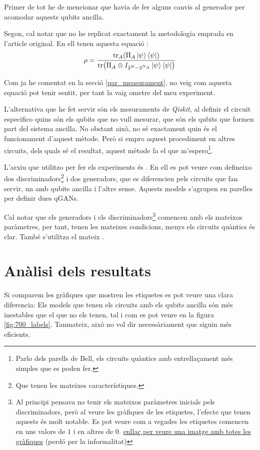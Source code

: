 Primer de tot he de mencionar que havia de fer alguns canvis al generador per acomodar aquests qubits ancilla. 

Segon, cal notar que no he replicat exactament la metodologia emprada en l'article original. En ell tenen aquesta equació \cite{QGAN_exp}: 
\begin{equation*}
\rho = \frac{\tr_A(\Pi_A \ket{\psi}\bra{\psi})}{\tr(\Pi_A\otimes I_{2^N-2^{N_A}}\ket{\psi}\bra{\psi})}
\end{equation*}

Com ja he comentat en la secció \ref{par_measurament}, no veig com aquesta equació pot tenir sentit, per tant la vaig ometre del meu experiment. 

L'alternativa que he fet servir són els mesuraments de \textit{Qiskit}, al definir el circuit especifico quins són els qubits que no vull mesurar, que són els qubits que formen part del sistema ancilla. No obstant això, no sé exactament quin és el funcionament d'aquest mètode. Però si empro aquest procediment en altres circuits, dels quals sé el resultat, aquest mètode fa el que m'espero\footnote{Parlo dels parells de Bell, els circuits quàntics amb entrellaçament més simples que es poden fer.}.

L'arxiu que utilitzo per fer els experiments és . En ell es pot veure com defineixo dos discriminadors\footnote{Que tenen les mateixes característiques.} i dos generadors, que es diferencien pels circuits que fan servir, un amb qubits ancilla i l'altre sense. Aquests models s'agrupen en parelles per definir dues qGANs.

Cal notar que els generadors i els discriminadors\footnote{Al principi pensava no tenir els mateixos paràmetres inicials pels discriminadors, però al veure les gràfiques de les etiquetes, l'efecte que tenen aquests és molt notable. Es pot veure com a vegades les etiquetes comencen en uns valors de $1$ i en altres de $0$. \href{https://drive.google.com/file/d/1kYZ1vmNYU17sofNluXFYnoATLfY5B0jG/view?usp=sharing}{enllaç per veure una imatge amb totes les gràfiques} (perdó per la informalitat)} comencen amb els mateixos paràmetres, per tant, tenen les mateixes condicions, menys els circuits quàntics és clar. També s'utilitza el mateix .

\section{Anàlisi dels resultats}
Si comparem les gràfiques que mostren les etiquetes es pot veure una clara diferencia: Els models que tenen els circuits amb els qubits ancilla són més inestables que el que no els tenen, tal i com es pot veure en la figura \ref{fig:700_labels}. Tanmateix, això no vol dir necessàriament que siguin més eficients. 

